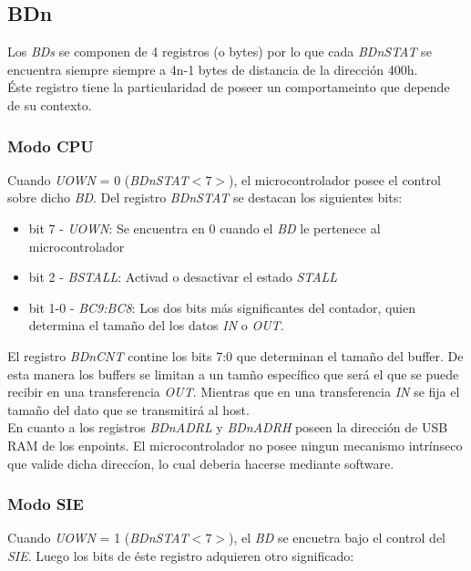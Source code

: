 \subsection{BDn}
Los \emph{BDs} se componen de 4 registros (o bytes) por lo que cada
\emph{BDnSTAT} se encuentra siempre siempre a 4n-1 bytes de distancia de la
direcci\'on 400h.\\

\'Este registro tiene la particularidad de poseer un comportameinto que
depende de su contexto.

\subsubsection{Modo CPU}
Cuando \emph{UOWN} = 0 (\emph{BDnSTAT$<7>$}), el microcontrolador posee el
control sobre dicho \emph{BD}. Del registro \emph{BDnSTAT} se destacan los
siguientes bits:

\begin{itemize}
 \item bit 7 - \emph{UOWN}: Se encuentra en 0 cuando el \emph{BD} le pertenece
al microcontrolador

 \item bit 2 - \emph{BSTALL}: Activad o desactivar el estado \emph{STALL}

 \item bit 1-0 - \emph{BC9:BC8}: Los dos bits m\'as significantes del
contador, quien determina el tama\~no del los datos \emph{IN} o \emph{OUT}.
\end{itemize}

El registro \emph{BDnCNT} contine los bits 7:0 que determinan el tama\~no del
buffer. De esta manera los buffers se limitan a un tam\~no espec\'ifico que
ser\'a el que se puede recibir en una transferencia \emph{OUT}. Mientras que
en una transferencia \emph{IN} se fija el tama\~no del dato que se
transmitir\'a al host.\\

En cuanto a los registros \emph{BDnADRL} y \emph{BDnADRH} poseen la
direcci\'on de USB RAM de los enpoints. El microcontrolador no posee ningun
mecanismo intr\'inseco que valide dicha direcc\'ion, lo cual deberia hacerse
mediante software.\\

\subsubsection{Modo SIE}
Cuando \emph{UOWN} = 1 (\emph{BDnSTAT$<7>$}), el \emph{BD} se encuetra bajo
el control del \emph{SIE}. Luego los bits de \'este registro adquieren otro
significado:

